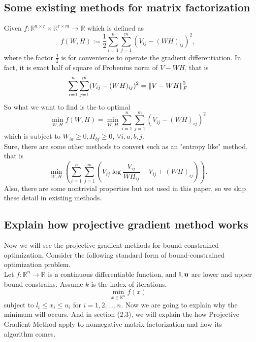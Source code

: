 \documentclass[12pt]{article}
\theoremstyle{remark}
\def\to{\rightarrow}
\def\bR{\mathbb R}
\def\bl{\bold l}
\def\bu{\bold u}
\begin{document}
\begin{CJK}{UTF8}{bsmi}
\subsection{Some existing methods for matrix factorization}
Given $f : \bR^{n\times r} \times \bR^{r\times m } \to \bR$ which is defined as 
$$
f(W,H) := \frac{1}{2}\sum_{i=1}^n \sum_{j=1}^m ( V_{ij} - (WH)_{ij} )^2,
$$
where the factor $\frac{1}{2}$ is for convenience to operate the gradient differentiation. In fact, it is exact half of square of Frobenius norm of $V-WH$, that is 
$$
\sum_{i=1}^n \sum_{j=1}^m ( V_{ij} - (WH)_{ij} )^2 = \norm{V-WH}^2_F
$$
So what we want to find is the to optimal
$$
\min_{W,H} f(W,H) = \min_{W,H}  \sum_{i=1}^n \sum_{j=1}^m ( V_{ij} - (WH)_{ij} )^2 
$$ which is subject to $W_{ia}\geq 0 , H_{bj}\geq 0$, $\forall i,a,b,j$. \\
Sure, there are some other methods to convert such as an "entropy like" method, that is
$$
\min_{W,H} \left( \sum_{i=1}^n\sum_{j=1}^m \left( V_{ij}\log{\frac{V_{ij}}{WH_{ij}} - V_{ij} +(WH)_{ij} } \right) \right).
$$
Also, there are some nontrivial properties but not used in this paper, so we skip these detail in existing methods.
\subsection{Explain how projective gradient method works }
Now we will see the projective gradient methods for bound-constrained optimization. Consider the following standard form of bound-constrained optimization problem.\\ 
Let $f:\bR^{n}\to \bR$ is a continuous differentiable function, and $\bl ,\bu$ are lower and upper bound-constrains. Assume $k$ is the index of iterations.
$$
\min _{x\in \bR^n} f(x)
$$
subject to $l_i \leq x_i \leq u_i$ for $i=1,2,...,n$. 
Now we are going to explain why the minimum will occurs. And in section (2.3), we will explain the how Projective Gradient Method apply to nonnegative matrix factorization and how its algorithm comes.


\end{CJK}
\end{document}
